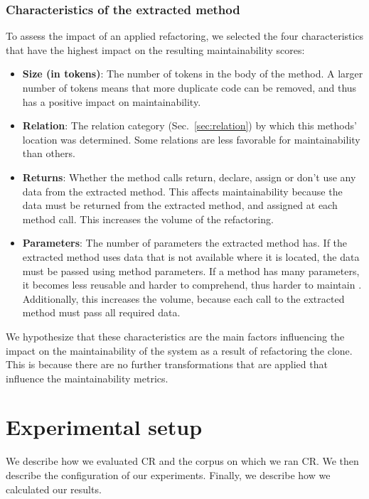 \documentclass[sigconf,review,anonymous]{acmart}
\begin{document}
\subsubsection{Characteristics of the extracted method}\label{sec:characteristics}
To assess the impact of an applied refactoring, we selected the four characteristics that have the highest impact on the resulting maintainability scores:
\begin{itemize}
\item \textbf{Size (in tokens)}: The number of tokens in the body of the method. A larger number of tokens means that more duplicate code can be removed, and thus has a positive impact on maintainability.
\item \textbf{Relation}: The relation category (Sec.~\ref{sec:relation}) by which this methods' location was determined. Some relations are less favorable for maintainability than others.
\item \textbf{Returns}: Whether the method calls return, declare, assign or don't use any data from the extracted method. This affects maintainability because the data must be returned from the extracted method, and assigned at each method call. This increases the volume of the refactoring.
\item \textbf{Parameters}: The number of parameters the extracted method has. If the extracted method uses data that is not available where it is located, the data must be passed using method parameters. If a method has many parameters, it becomes less reusable and harder to comprehend, thus harder to maintain \cite{heitlager2007practical}. Additionally, this increases the volume, because each call to the extracted method must pass all required data.
\end{itemize}
We hypothesize that these characteristics are the main factors influencing the impact on the maintainability of the system as a result of refactoring the clone. This is because there are no further transformations that are applied that influence the maintainability metrics.

\section{Experimental setup} \label{sec:experimentalsetup}
We describe how we evaluated CR and the corpus on which we ran CR. We then describe the configuration of our experiments. Finally, we describe how we calculated our results.
\end{document}
